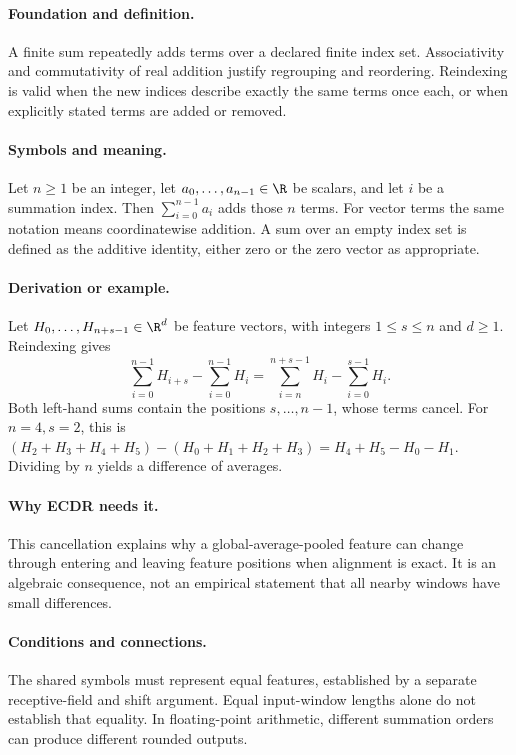 \paragraph{Foundation and definition.}
A finite sum repeatedly adds terms over a declared finite index set.
Associativity and commutativity of real addition justify regrouping and
reordering. Reindexing is valid when the new indices describe exactly the
same terms once each, or when explicitly stated terms are added or removed.
\paragraph{Symbols and meaning.}
Let $n\ge1$ be an integer, let $a_0,\ldots,a_{n-1}\in\R$ be scalars,
and let $i$ be a summation index. Then $\sum_{i=0}^{n-1}a_i$ adds those
$n$ terms. For vector terms the same notation means coordinatewise
addition. A sum over an empty index set is defined as the additive
identity, either zero or the zero vector as appropriate.
\paragraph{Derivation or example.}
Let $H_0,\ldots,H_{n+s-1}\in\R^d$ be feature vectors, with integers
$1\le s\le n$ and $d\ge1$. Reindexing gives
\[
 \sum_{i=0}^{n-1}H_{i+s}-\sum_{i=0}^{n-1}H_i
 =\sum_{i=n}^{n+s-1}H_i-\sum_{i=0}^{s-1}H_i.
\]
Both left-hand sums contain the positions $s,\ldots,n-1$, whose terms
cancel. For $n=4,s=2$, this is
$(H_2+H_3+H_4+H_5)-(H_0+H_1+H_2+H_3)
=H_4+H_5-H_0-H_1$. Dividing by $n$ yields a difference of averages.
\paragraph{Why ECDR needs it.}
This cancellation explains why a global-average-pooled feature can change
through entering and leaving feature positions when alignment is exact.
It is an algebraic consequence, not an empirical statement that all
nearby windows have small differences.
\paragraph{Conditions and connections.}
The shared symbols must represent equal features, established by a
separate receptive-field and shift argument. Equal input-window lengths
alone do not establish that equality. In floating-point arithmetic,
different summation orders can produce different rounded outputs.


